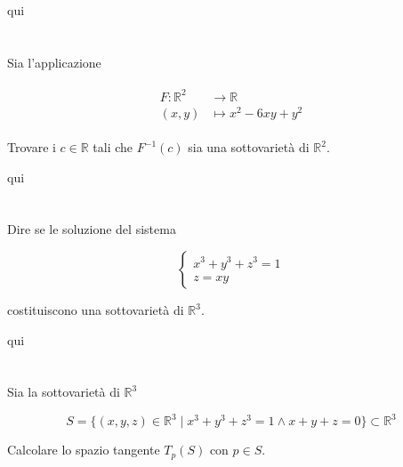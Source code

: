 qui

\section{}\label{es2-13}

\begin{tcolorbox}
	Sia l'applicazione
	
	\begin{align}
		\begin{split}
			F : \mathbb{R}^{2} &\to \mathbb{R}\\
			(x,y) &\mapsto x^{2}-6xy+y^{2}
		\end{split}
	\end{align}

	Trovare i $ c \in \mathbb{R} $ tali che $ F^{-1}(c) $ sia una sottovarietà di $ \mathbb{R}^{2} $.
\end{tcolorbox}

qui

\section{}\label{es2-14}

\begin{tcolorbox}
	Dire se le soluzione del sistema
	
	\begin{equation}
		\begin{cases}
			x^{3} + y^{3} + z^{3} = 1\\
			z = xy
		\end{cases}
	\end{equation}

	costituiscono una sottovarietà di $ \mathbb{R}^{3} $.
\end{tcolorbox}

qui

\section{}\label{BONUS2-3}

\begin{tcolorbox}
	Sia la sottovarietà di $ \mathbb{R}^{3} $
	
	\begin{equation}
		S = \{ (x,y,z) \in \mathbb{R}^{3} \mid x^{3} + y^{3} + z^{3} = 1 \wedge x+y+z=0 \} \subset \mathbb{R}^{3}
	\end{equation}
	
	Calcolare lo spazio tangente $ T_{p}(S) $ con $ p \in S $.
\end{tcolorbox}


